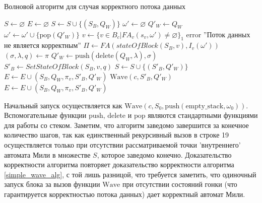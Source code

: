 \documentclass[10pt,a4paper]{article}
\newcommand{\FA}{F\!A}
\begin{document}
  \begin{algorithm}
    \caption{Волновой алгоритм для случая корректного потока данных}
    \label{wave_alg}
    \begin{algorithmic}[1]
      \State $S \leftarrow \varnothing$
      \State $E \leftarrow \varnothing$
         \State $S \leftarrow S \cup \{(S_B, Q_W)\}$
         \State $\omega' \leftarrow \varnothing$
         \State $Q'_W \leftarrow Q_W$
         \While{$\forall v \in B_c : \FA_v(s_v, \omega') = \varnothing \vee \neg \zeta(\sigma, \omega)$}
           \State $\omega' \leftarrow \omega' \cup \{\text{pop}(Q'_W)\}$
         \EndWhile
         \Statex
         \If{$\lvert \{v \in B_c \vert \FA_v(s_v, \omega') \neq \varnothing \} \rvert = 1$}
           \State $v \leftarrow \{v \in B_c \vert \FA_v(s_v, \omega') \neq \varnothing \}_1$
         \Else
           \State error ''Поток данных не является корректным''
         \EndIf
         \State $\Pi \leftarrow \FA(stateOfBlock(S_B, v), I_v(\omega'))$
           \State $(\sigma, \lambda, q) \leftarrow \pi$
           \State $Q'_W \leftarrow \text{push}(\text{delete}(Q_W, \lambda), \sigma)$
           \State $S'_B \leftarrow SetStateOfBlock(S_B, v, q)$
             \State $S \leftarrow S \cup \{(S'_B, Q'_W)\}$
             \State $E \leftarrow E \cup (S_B, Q_W, \pi_v, S'_B, Q'_W)$
             \State $\text{Wave}(c, S'_B, Q'_W)$
          \Else
             \State $E \leftarrow E \cup (S_B, Q_W, \pi_v, S'_B, Q'_W)$
          \EndIf
         \EndFor
      \EndFunction
    \end{algorithmic}
  \end{algorithm}
  
  Начальный запуск осуществляется как $\text{Wave}(c, S_0, \text{push}(\text{empty\_stack}, \omega_0))$.
  Вспомогательные функции $\text{push}$, $\text{delete}$ и $\text{pop}$ являются стандартными функциями для работы со стеком.
  Заметим, что алгоритм заведомо завершится за конечное количество шагов, так как единственный рекурсивный вызов в строке 19 осуществляется только при отсутствии рассматриваемой
  точки 'внутреннего' автомата Мили в множестве $S$, которое заведомо конечно. Доказательство корректности алгоритма повторяет доказательство
  корректности алгоритма \ref{simple_wave_alg}, с той лишь разницой, что требуется заметить, что одиночный запуск блока за вызов функции $\text{Wave}$ при отсутствии
  состояний гонки (что гарантируется корректностью потока данных) дает корректный автомат Мили.
  
\end{document}
